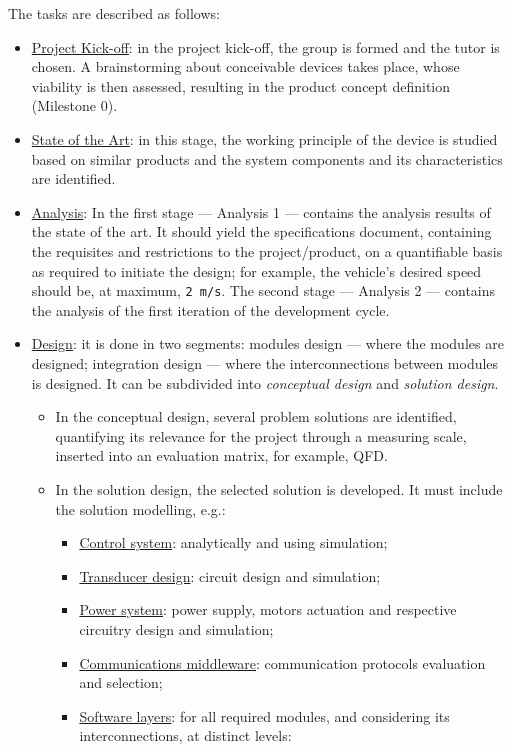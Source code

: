 The tasks are described as follows:
\begin{itemize}
\item \uline{Project Kick-off}: in the project kick-off, the group is formed and the tutor
is chosen. A brainstorming about conceivable devices takes place, whose
viability is then assessed, resulting in the product concept definition
(Milestone 0).
\item \uline{State of the Art}: in this stage, the working principle of the device is
studied based on similar products and the system components and its
characteristics are identified.
\item \uline{Analysis}: In the first stage --- Analysis 1 --- contains the analysis
results of the state of the art. It should yield the specifications document,
containing the requisites and restrictions to the project/product, on a
quantifiable basis as required to initiate the design; for example, the
vehicle's desired speed should be, at maximum, \texttt{2 m/s}. The second stage --- Analysis 2
--- contains the analysis of the first iteration of the development cycle.
\item \uline{Design}: it is done in two segments: modules design --- where the modules are
designed; integration design --- where the interconnections between modules is
designed. It can be subdivided into \emph{conceptual design} and \emph{solution
design}. 
\begin{itemize}
\item In the conceptual design, several problem solutions are identified,
quantifying its relevance for the project through a measuring scale,
inserted into an evaluation matrix, for example, QFD.%
\item In the solution design, the selected solution is developed. It must include
the solution modelling, e.g.:
\begin{itemize}
\item \uline{Control system}: analytically and using simulation;
\item \underline{Transducer design}: circuit design and simulation;
\item \uline{Power system}: power supply, motors actuation and
  respective circuitry design and simulation;
\item \uline{Communications middleware}: communication protocols evaluation and
  selection;
\item \uline{Software layers}: for all required modules, and considering its
  interconnections, at distinct levels:
  \begin{itemize}

\end{itemize}
\end{itemize}
\end{itemize}
\end{itemize}
